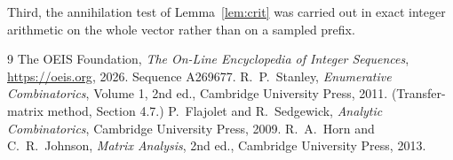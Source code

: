 \documentclass[11pt,a4paper]{article}
\theoremstyle{plain}
\theoremstyle{definition}
\begin{document}
Third, the annihilation test of Lemma~\ref{lem:crit} was carried out in exact integer
arithmetic on the whole vector rather than on a sampled prefix.

\begin{thebibliography}{9}
 The OEIS Foundation, \emph{The On-Line Encyclopedia of Integer
Sequences}, \url{https://oeis.org}, 2026. Sequence A269677.
 R.~P.~Stanley, \emph{Enumerative Combinatorics}, Volume 1, 2nd ed.,
Cambridge University Press, 2011. (Transfer-matrix method, Section 4.7.)
 P.~Flajolet and R.~Sedgewick, \emph{Analytic Combinatorics}, Cambridge
University Press, 2009.
 R.~A.~Horn and C.~R.~Johnson, \emph{Matrix Analysis}, 2nd ed., Cambridge
University Press, 2013.
\end{thebibliography}
\end{document}
